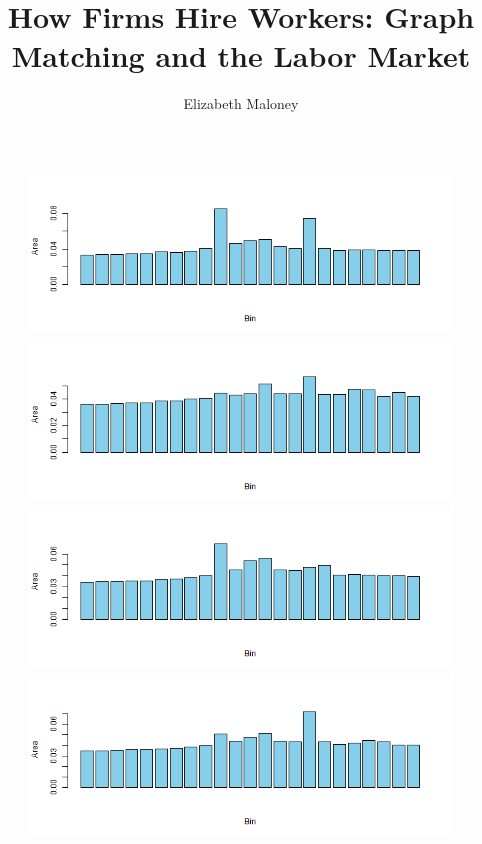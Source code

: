 \documentclass[11pt]{article}
\theoremstyle{plain}
\theoremstyle{definition}
\begin{document}
 

\title{How Firms Hire Workers: Graph Matching and the Labor Market}
\author{Elizabeth Maloney}
\begin{figure}[H]
\begin{center}
\includegraphics[trim ={3.5cm 2.7cm 2cm 2cm},scale=.6, clip=true]{Binned_Areas25.png}
\includegraphics[trim ={3.5cm 2.7cm 2cm 2cm},scale=.6, clip=true]{Binned_Areas26.png}
\includegraphics[trim ={3.5cm 2.7cm 2cm 2cm},scale=.6, clip=true]{Binned_Areas27.png}
\includegraphics[trim ={3.5cm 2.7cm 2cm 2cm},scale=.6, clip=true]{Binned_Areas28.png}

\end{center}
\end{figure}
\end{document}
